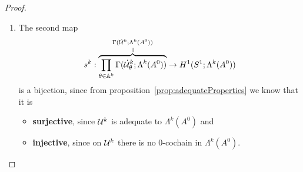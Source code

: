 \begin{proof}
\begin{enumerate}
\begin{comment}
                ODE-Theory, says that a germ defines a solution in a
                \textbf{neighbourhood}
              \item \PROBLEM[why is the neighbourhood large enough?] I.e.\
                \[
                  \substack{the\\neighbourhood}\supset\cU_\theta^k \,?
                \]
            \end{itemize}
          \item $U_\alpha^k$ is the largest arc, to contain no corresponding
            Stokes ray 
            \begin{itemize}
              \item Then might \cite[Lemma 1]{BJL1979Birkhoff} on p.\ 73 help
            \end{itemize}
          \item maybe follows from \cite[Prop.1.24]{thboalch}
          \item \textbf{See \cite{babbitt1989local}}
        \end{itemize}
      \end{comment}
    \item The second map
      \[
        s^k:
        \overset{\Gamma(\dot\cU^k;\Lambda^k(A^0))}{%
          \overset{\text{\rotatebox[origin=c]{-90}{$=$}}}{%
            \overbrace{%
              \prod_{\theta\in\A^k}\Gamma(\dot\cU_\theta^k;\Lambda^k(A^0))
            }
        }}
        \to
        H^1(S^1;\Lambda^k(A^0))
      \]
      is a bijection, since from proposition~\ref{prop:adequateProperties} we
      know that it is
      \begin{itemize}
        \item \textbf{surjective}, since $\mathcal{U}^k$ is adequate to
          $\Lambda^k(A^0)$ and
        \item \textbf{injective}, since on $\mathcal{U}^k$ there is no $0$-cochain in
          $\Lambda^k(A^0)$.
      \end{itemize}
  \end{enumerate}
  \PROBLEM[Naturality?]
\end{proof}

